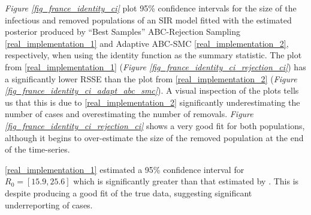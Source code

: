 \documentclass[11pt,a4paper]{article}
\theoremstyle{break}
\begin{document}
  \par \textit{Figure \ref{fig_france_identity_ci}} plot 95\% confidence intervals for the size of the infectious and removed populations of an SIR model fitted with the estimated posterior produced by ``Best Samples'' ABC-Rejection Sampling \ref{real_implementation_1} and Adaptive ABC-SMC \ref{real_implementation_2}, respectively, when using the identity function as the summary statistic. The plot from \ref{real_implementation_1} (\textit{Figure \ref{fig_france_identity_ci_rejection_ci}}) has a significantly lower RSSE than the plot from \ref{real_implementation_2} (\textit{Figure \ref{fig_france_identity_ci_adapt_abc_smc}}). A visual inspection of the plots tells us that this is due to \ref{real_implementation_2} significantly underestimating the number of cases and overestimating the number of removals. \textit{Figure \ref{fig_france_identity_ci_rejection_ci}} shows a very good fit for both populations, although it begins to over-estimate the size of the removed population at the end of the time-series.

  \par \ref{real_implementation_1} estimated a 95\% confidence interval for $R_0=[15.9,25.6]$ which is significantly greater than that estimated by \cite[]{estimated_r0_covid_19}. This is despite producing a good fit of the true data, suggesting significant underreporting of cases.
\end{document}
